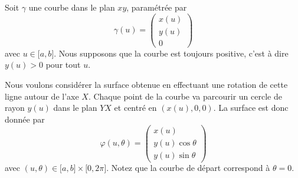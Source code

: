 Soit $\gamma$ une courbe dans le plan $xy$, paramétrée par
\begin{equation}
    \gamma(u)=\begin{pmatrix}
        x(u)    \\
        y(u)    \\
        0
    \end{pmatrix}
\end{equation}
avec $u\in\mathopen[ a , b \mathclose]$. Nous supposons que la courbe est toujours positive, c'est à dire $y(u)>0$ pour tout $u$.

Nous voulons considérer la surface obtenue en effectuant une rotation de cette ligne autour de l'axe $X$. Chaque point de la courbe va parcourir un cercle de rayon $y(u)$ dans le plan $YX$ et centré en $(x(u),0,0)$. La surface est donc donnée par
\begin{equation}
    \varphi(u,\theta)=\begin{pmatrix}
        x(u)    \\
        y(u)\cos\theta    \\
        y(u)\sin\theta
    \end{pmatrix}
\end{equation}
avec $(u,\theta)\in\mathopen[ a , b \mathclose]\times \mathopen[ 0 , 2\pi \mathclose]$. Notez que la courbe de départ correspond à $\theta=0$.

